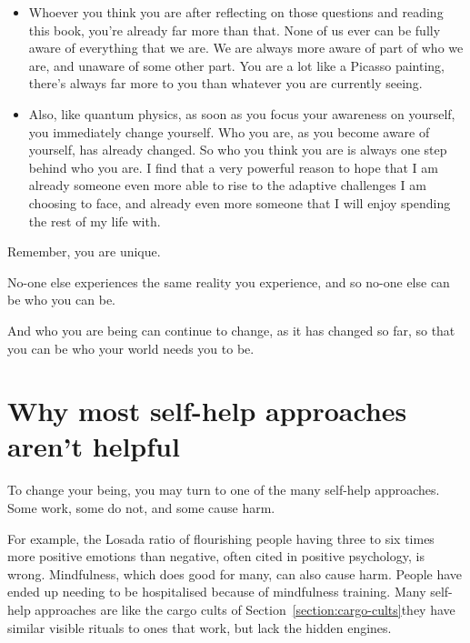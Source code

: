 \begin{itemize}
\item Whoever you think you are after reflecting on those questions and reading this book, you're already far more than that. None of us ever can be fully aware of everything that we are. We are always more aware of part of who we are, and unaware of some other part. You are a lot like a Picasso painting, there's always far more to you than whatever you are currently seeing.
\item Also, like quantum physics, as soon as you focus your awareness on yourself, you immediately change yourself. Who you are, as you become aware of yourself, has already changed. So who you think you are is always one step behind who you are. I find that a very powerful reason to hope that I am already someone even more able to rise to the adaptive challenges I am choosing to face, and already even more someone that I will enjoy spending the rest of my life with.
\end{itemize}


Remember, you are unique. 


No-one else experiences the same reality you experience, and so no-one else can be who you can be. 


And who you are being can continue to change, as it has changed so far, so that you can be who your world needs you to be.




\section{Why most self-help approaches aren’t helpful}
\label{section:empiricism}




To change your being, you may turn to one of the many self-help approaches. Some work, some do not, and some cause harm. 


For example, the Losada ratio of flourishing people having three to six times more positive emotions than negative, often cited in positive psychology, is wrong\cite{sokal-losada-wrong}. Mindfulness, which does good for many, can also cause harm\cite{farias-buddha}. People have ended up needing to be hospitalised because of mindfulness training. Many self-help approaches are like the cargo cults of Section~\ref{section:cargo-cults}\textemdash they have similar visible rituals to ones that work, but lack the hidden engines.


